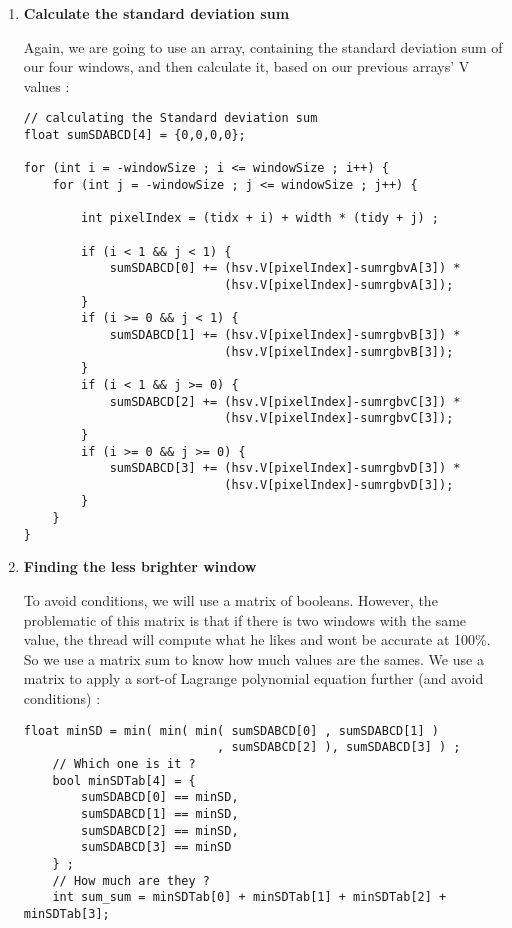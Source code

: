 \documentclass{article}
\begin{document}
\begin{enumerate}
\begin{verbatim}
    \end{verbatim}
    
    \item \textbf{Calculate the standard deviation sum}
    
    Again, we are going to use an array, containing the standard deviation sum of our four windows, and then calculate it, based on our previous arrays' V values : 
    
    \begin{verbatim}
// calculating the Standard deviation sum 
float sumSDABCD[4] = {0,0,0,0};

for (int i = -windowSize ; i <= windowSize ; i++) {
    for (int j = -windowSize ; j <= windowSize ; j++) {
            
        int pixelIndex = (tidx + i) + width * (tidy + j) ;
        
        if (i < 1 && j < 1) {
        	sumSDABCD[0] += (hsv.V[pixelIndex]-sumrgbvA[3]) *
        	                (hsv.V[pixelIndex]-sumrgbvA[3]);
        }
        if (i >= 0 && j < 1) {
        	sumSDABCD[1] += (hsv.V[pixelIndex]-sumrgbvB[3]) *
        	                (hsv.V[pixelIndex]-sumrgbvB[3]);
        }
        if (i < 1 && j >= 0) {
        	sumSDABCD[2] += (hsv.V[pixelIndex]-sumrgbvC[3]) *
        	                (hsv.V[pixelIndex]-sumrgbvC[3]);
        }
        if (i >= 0 && j >= 0) {
        	sumSDABCD[3] += (hsv.V[pixelIndex]-sumrgbvD[3]) *
        	                (hsv.V[pixelIndex]-sumrgbvD[3]);
        }
    }
}
    \end{verbatim}
    
    \item \textbf{Finding the less brighter window}
    
    To avoid conditions, we will use a matrix of booleans. However, the problematic of this matrix is that if there is two windows with the same value, the thread will compute what he likes and wont be accurate at 100\%. So we use a matrix sum to know how much values are the sames. We use a matrix to apply a sort-of Lagrange polynomial equation further (and avoid conditions) :
    
    \begin{verbatim}
float minSD = min( min( min( sumSDABCD[0] , sumSDABCD[1] )
                           , sumSDABCD[2] ), sumSDABCD[3] ) ;
    // Which one is it ?
    bool minSDTab[4] = {
    	sumSDABCD[0] == minSD, 
    	sumSDABCD[1] == minSD,
    	sumSDABCD[2] == minSD,
    	sumSDABCD[3] == minSD
    } ;
    // How much are they ? 
    int sum_sum = minSDTab[0] + minSDTab[1] + minSDTab[2] + minSDTab[3];
    \end{verbatim}
    

\end{enumerate}
\end{document}
